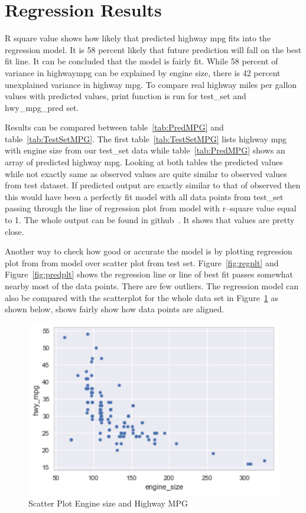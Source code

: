   
\section{Regression Results}

 R square value shows how likely that predicted highway mpg fits into the
 regression model. It is 58 percent likely that future prediction will fall
 on the best fit line. It can be concluded that the model is fairly fit. While 
 58 percent of variance in highwaympg can be explained by engine size,
 there is 42 percent unexplained
 variance in highway mpg. To compare real highway miles per gallon values with 
 predicted values, print function is
 run for test\_set and hwy\_mpg\_pred set.
 
 Results can be compared between table~\ref{tab:PredMPG} 
 and table~\ref{tab:TestSetMPG}. 
 The first table~\ref{tab:TestSetMPG} lists highway mpg with engine size from our
 test\_set data while table~\ref{tab:PredMPG} shows an array of predicted highway mpg. 
 Looking at both tables the predicted values while not exactly same as observed 
 values are quite similar to observed values from test dataset. If predicted
 output are exactly similar to that of observed then this would have been a 
 perfectly fit model with all data points from test\_set passing through the
 line of regression plot from model with r--square value equal to 1.
 The whole output can be found in github~\cite{hid-sp18-415-analysis}.
 It shows that values are pretty close.
 
 Another way to check how good or accurate the model is by plotting regression 
 plot from from model over scatter plot from test set. 
 Figure~\ref{fig:regplt}  and Figure~\ref{fig:predplt} shows 
 the regression line or line of best fit passes somewhat nearby most of the data
 points. There are few outliers. The regression model can also be compared with 
 the scatterplot for the whole data set
 in Figure~\ref{fig:scatterplt} as shown below, shows fairly show how data 
 points are aligned.
 
  \begin{figure}[h!]
  \includegraphics[scale=1.0]{images/scatterplot.pdf}
  \caption{Scatter Plot Engine size and Highway MPG}
\label{fig:scatterplt}
\end{figure} 
 
